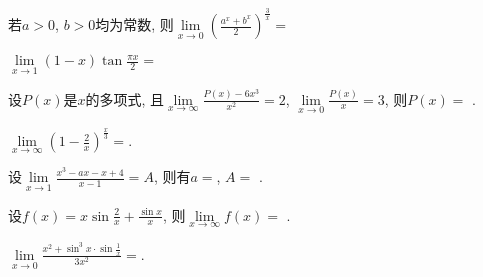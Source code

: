 \begin{problem}
	若$a > 0$, $b > 0$均为常数, 则$\displaystyle \lim\limits_{x \rightarrow 0}\left( \frac{a^{x} + b^{x}}{2} \right)^{\frac{3}{x}} =$
	
	
\end{problem}           

\begin{problem}
	$\displaystyle \lim\limits_{x \rightarrow 1}(1 - x)\tan\frac{\pi x}{2} =$
	
	
\end{problem}           


\begin{problem}
	设$P(x)$是$x$的多项式, 且$\displaystyle \lim\limits_{x \rightarrow \infty}\frac{P(x) - 6x^{3}}{x^{2}} = 2$, $\displaystyle \lim\limits_{x \rightarrow 0}\frac{P(x)}{x} = 3$, 则$P(x) =$
	.
	
	
\end{problem}           

\begin{problem}
	$\displaystyle \lim\limits_{x \rightarrow \infty}\left( 1 - \frac{2}{x} \right)^{\frac{x}{3}} =$.
	
		
	\end{problem}          

 \begin{problem}
 	设$\displaystyle \lim\limits_{x \rightarrow 1}\frac{x^{3} - ax - x + 4}{x - 1} = A$, 则有$a =$, $A =$ .
		
			
\end{problem}
\begin{problem}
设$\displaystyle f(x) = x\sin\frac{2}{x} + \frac{\sin x}{x}$, 则$\lim\limits_{x \rightarrow \infty}f(x) =$
			.
			
	\end{problem}           
		
\begin{problem}
	$\displaystyle \lim\limits_{x \rightarrow 0}\frac{x^{2} + \sin^{3}x \cdot \sin\frac{1}{x}}{3x^{2}} =$.
		
\end{problem}           

